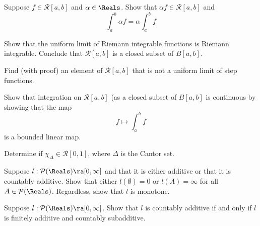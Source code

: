 \documentclass[minion]{homework}
\def\Riem{\mathcal{R}}
\begin{document}
\begin{aproblems}


\hproblem [Mason] Suppose $f\in\Riem[a,b]$ and $\alpha\in\Reals$.  Show that $\alpha f\in\Riem[a,b]$ and
$$
\int_a^b \alpha f = \alpha \int_a^b f
$$

\hproblem [Sakti] Show that the uniform limit of Riemann integrable functions 
is Riemann integrable.  Conclude that $\Riem[a,b]$ is a closed
subset of $B[a,b]$.

\hproblem [Max] Find (with proof) an element of $\Riem[a,b]$ that is not a uniform limit of step functions.
  
\hproblem [Jody] Show that integration on $\Riem[a,b]$ (as a closed subset
of $B[a,b]$ is continuous by showing that the map
$$
f\mapsto \int_a^b f
$$
is a bounded linear map.

\hproblem [Lander] Determine if $\chi_\Delta\in \Riem[0,1]$,
where $\Delta$ is the Cantor set.

\hproblem [Jody] Suppose $l:{\mathcal P}(\Reals)\ra [0,\infty]$
and that it is either additive or that it is countably additive.
Show that either $l(\emptyset)=0$ or $l(A)=\infty$ for all $A\in\mathcal P(\Reals)$.  Regardless, show that $l$ is monotone.

\hproblem [Mason] Suppose $l:{\mathcal P}(\Reals)\ra [0,\infty]$.
Show that $l$ is countably additive
if and only if $l$ is finitely additive and countably
subadditive. 

\end{aproblems}
\end{document}
